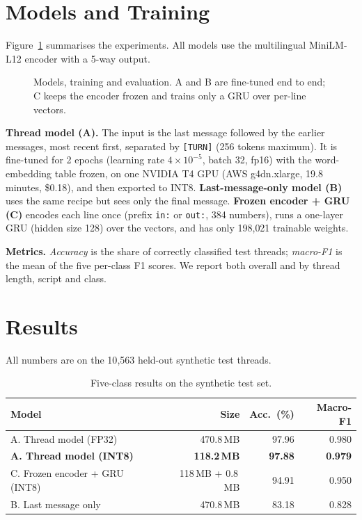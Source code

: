 \documentclass[sigconf,9pt]{acmart}
\begin{document}
\section{Models and Training}\label{sec:training}
Figure~\ref{fig:training} summarises the experiments. All models use the multilingual MiniLM-L12 encoder \cite{reimers2020multilingual,wang2020minilm} with a 5-way output.

\begin{figure}[!t]
  \centering
  \resizebox{\textwidth}{!}{}
  \caption{Models, training and evaluation. A and B are fine-tuned end to end; C keeps the encoder frozen and trains only a GRU \cite{cho2014gru} over per-line vectors.}
  \label{fig:training}
\end{figure}

\par\textbf{Thread model (A).} The input is the last message followed by the earlier messages, most recent first, separated by \texttt{[TURN]} (256 tokens maximum). It is fine-tuned for 2 epochs (learning rate $4\times10^{-5}$, batch 32, fp16) with the word-embedding table frozen, on one NVIDIA T4 GPU (AWS g4dn.xlarge, 19.8 minutes, \$0.18), and then exported to INT8. \textbf{Last-message-only model (B)} uses the same recipe but sees only the final message. \textbf{Frozen encoder + GRU (C)} encodes each line once (prefix \texttt{in:} or \texttt{out:}, 384 numbers), runs a one-layer GRU (hidden size 128) over the vectors, and has only 198{,}021 trainable weights.

\par\textbf{Metrics.} \emph{Accuracy} is the share of correctly classified test threads; \emph{macro-F1} is the mean of the five per-class F1 scores. We report both overall and by thread length, script and class.

\section{Results}\label{sec:results}
All numbers are on the 10{,}563 held-out synthetic test threads.

\begin{table}[h!]
\centering
\caption{Five-class results on the synthetic test set.}
\label{tab:main_results}
\small
\begin{tabularx}{\linewidth}{@{}l r R R@{}}
\toprule
\textbf{Model} & \textbf{Size} & \textbf{Acc.\ (\%)} & \textbf{Macro-F1} \\
\midrule
A. Thread model (FP32)    & 470.8\,MB & 97.96 & 0.980 \\
\textbf{A. Thread model (INT8)} & \textbf{118.2\,MB} & \textbf{97.88} & \textbf{0.979} \\
C. Frozen encoder + GRU (INT8) & 118\,MB + 0.8\,MB & 94.91 & 0.950 \\
B. Last message only      & 470.8\,MB & 83.18 & 0.828 \\
\bottomrule
\end{tabularx}
\end{table}
\end{document}
